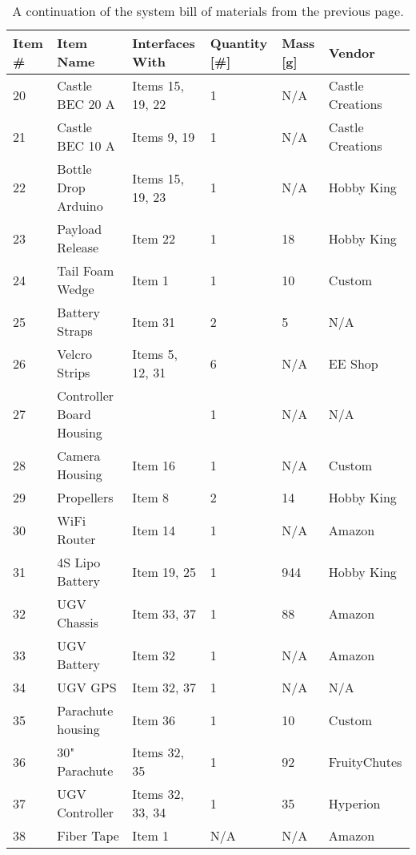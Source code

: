 \documentclass[]{auvsi_doc}
\begin{document}
	\begin{table}[h!]
		\begin{center}
			\caption{A continuation of the system bill of materials from the previous page.}
			\label{table:BOM}
			\begin{tabular}{p{1cm}p{4cm}p{3cm}p{1.5cm}p{1cm}p{2.5cm}}
				\toprule
				Item \# & Item Name & Interfaces With & Quantity [\#] & Mass [g] & Vendor \\
				\midrule
				20 & Castle BEC 20 A & Items 15, 19, 22 & 1 & N/A & Castle \newline Creations \\
				21 & Castle BEC 10 A & Items 9, 19 & 1 & N/A & Castle \newline Creations \\
				22 & Bottle Drop Arduino & Items 15, 19, 23 & 1 & N/A & Hobby King \\
				23 & Payload Release & Item 22 & 1 & 18 & Hobby King \\
				24 & Tail Foam Wedge & Item 1 & 1 & 10 & Custom \\
				25 & Battery Straps & Item 31 & 2 & 5 & N/A \\
				26 & Velcro Strips & Items 5, 12, 31 & 6 & N/A & EE Shop \\
				27 & Controller Board \newline Housing &   & 1 & N/A & N/A \\
				28 & Camera Housing & Item 16 & 1 & N/A & Custom \\
				29 & Propellers & Item 8 & 2 & 14 & Hobby King \\
				30 & WiFi Router & Item 14 & 1 & N/A & Amazon \\
				31 & 4S Lipo Battery & Item 19, 25 & 1 & 944 & Hobby King \\
				32 & UGV Chassis & Item 33, 37 & 1 & 88 & Amazon \\
				33 & UGV Battery & Item 32 & 1 & N/A & Amazon \\
				34 & UGV GPS & Item 32, 37 & 1 & N/A & N/A \\
				35 & Parachute housing & Item 36 & 1 & 10 & Custom \\
				36 & 30" Parachute & Items 32, 35 & 1 & 92 & FruityChutes \\
				37 & UGV Controller & Items 32, 33, 34 & 1 & 35 & Hyperion \\
				38 & Fiber Tape & Item 1 & N/A & N/A & Amazon \\
				\bottomrule
			\end{tabular}
		\end{center}
	\end{table}
\end{document}
